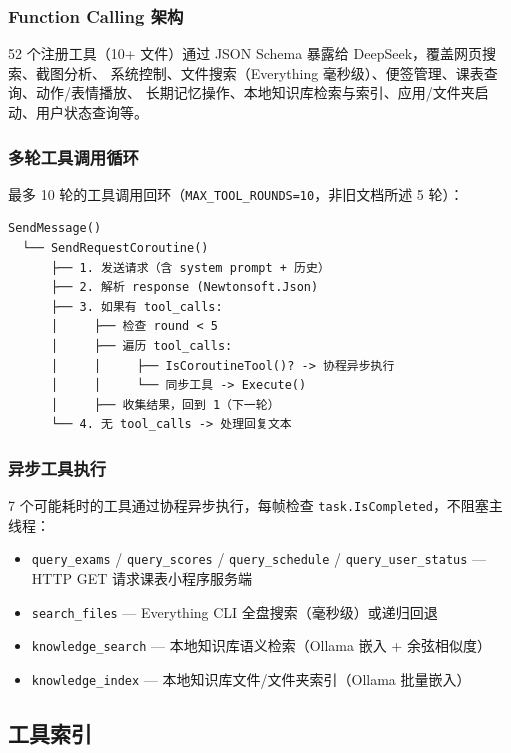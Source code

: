\documentclass[12pt,a4paper]{ctexart}
\begin{document}
\subsubsection{Function Calling 架构}

52 个注册工具（10+ 文件）通过 JSON Schema 暴露给 DeepSeek，覆盖网页搜索、截图分析、
系统控制、文件搜索（Everything 毫秒级）、便签管理、课表查询、动作/表情播放、
长期记忆操作、本地知识库检索与索引、应用/文件夹启动、用户状态查询等。

\subsubsection{多轮工具调用循环}

最多 10 轮的工具调用回环（\texttt{MAX\_TOOL\_ROUNDS=10}，非旧文档所述 5 轮）：

\begin{lstlisting}[style=csharp,caption={多轮工具调用循环},label={lst:tool-loop}]
SendMessage()
  └── SendRequestCoroutine()
      ├── 1. 发送请求（含 system prompt + 历史）
      ├── 2. 解析 response (Newtonsoft.Json)
      ├── 3. 如果有 tool_calls:
      │     ├── 检查 round < 5
      │     ├── 遍历 tool_calls:
      │     │     ├── IsCoroutineTool()? -> 协程异步执行
      │     │     └── 同步工具 -> Execute()
      │     ├── 收集结果，回到 1（下一轮）
      └── 4. 无 tool_calls -> 处理回复文本
\end{lstlisting}

\subsubsection{异步工具执行}

7 个可能耗时的工具通过协程异步执行，每帧检查 \texttt{task.IsCompleted}，不阻塞主线程：

\begin{itemize}
    \item \texttt{query\_exams} / \texttt{query\_scores} / \texttt{query\_schedule} / \texttt{query\_user\_status}
          --- HTTP GET 请求课表小程序服务端
    \item \texttt{search\_files} --- Everything CLI 全盘搜索（毫秒级）或递归回退
    \item \texttt{knowledge\_search} --- 本地知识库语义检索（Ollama 嵌入 + 余弦相似度）
    \item \texttt{knowledge\_index} --- 本地知识库文件/文件夹索引（Ollama 批量嵌入）
\end{itemize}

\subsection{工具索引}
\end{document}
